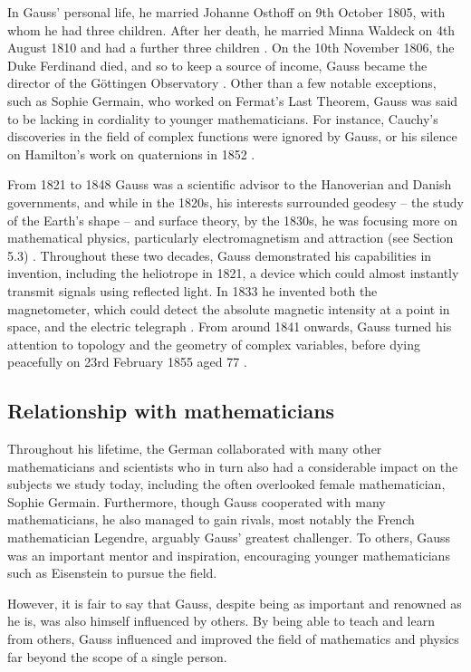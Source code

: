 \documentclass{article}
\begin{document}
In Gauss’ personal life, he married Johanne Osthoff on 9th October 1805, with whom he had three children. After her death, he married Minna Waldeck on 4th August 1810 and had a further three children \cite{menofmaths}. On the 10th November 1806, the Duke Ferdinand died, and so to keep a source of income, Gauss became the director of the G\"{o}ttingen Observatory \cite{menofmaths}. Other than a few notable exceptions, such as Sophie Germain, who worked on Fermat’s Last Theorem, Gauss was said to be lacking in cordiality to younger mathematicians. For instance, Cauchy’s discoveries in the field of complex functions were ignored by Gauss, or his silence on Hamilton’s work on quaternions in 1852 \cite{menofmaths}. 

From 1821 to 1848 Gauss was a scientific advisor to the Hanoverian and Danish governments, and while in the 1820s, his interests surrounded geodesy – the study of the Earth’s shape – and surface theory, by the 1830s, he was focusing more on mathematical physics, particularly electromagnetism and attraction (see Section 5.3) \cite{menofmaths}. Throughout these two decades, Gauss demonstrated his capabilities in invention, including the heliotrope in 1821, a device which could almost instantly transmit signals using reflected light. In 1833 he invented both the magnetometer, which could detect the absolute magnetic intensity at a point in space, and the electric telegraph \cite{menofmaths}. From around 1841 onwards, Gauss turned his attention to topology and the geometry of complex variables, before dying peacefully on 23rd February 1855 aged 77 \cite{menofmaths}. 

\subsection{Relationship with mathematicians}

Throughout his lifetime, the German collaborated with many other mathematicians and scientists who in turn also had a considerable impact on the subjects we study today, including the often overlooked female mathematician, Sophie Germain. Furthermore, though Gauss cooperated with many mathematicians, he also managed to gain rivals, most notably the French mathematician Legendre, arguably Gauss’ greatest challenger. To others, Gauss was an important mentor and inspiration, encouraging younger mathematicians such as Eisenstein to pursue the field. 

However, it is fair to say that Gauss, despite being as important and renowned as he is, was also himself influenced by others. By being able to teach and learn from others, Gauss influenced and improved the field of mathematics and physics far beyond the scope of a single person. 
\end{document}
